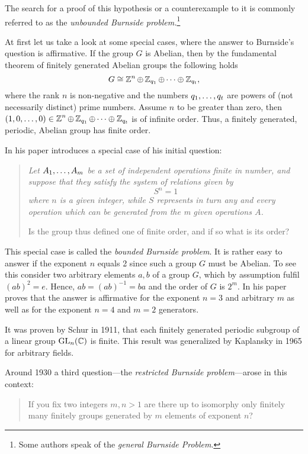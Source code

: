 The search for a proof of this hypothesis or a counterexample to it is commonly referred to as the \emph{unbounded Burnside problem.}\footnote{Some authors speak of the \emph{general Burnside Problem}.}

At first let us take a look at some special cases, where the answer to Burnside's question is affirmative. If the group $G$ is Abelian, then by the fundamental theorem of finitely generated Abelian groups the following holds
\begin{equation*}
G\cong\Z^n \oplus \Z_{q_1} \oplus \cdots \oplus \Z_{q_t},
\end{equation*}
where the rank $n$ is non-negative and the numbers $\seq[t]{q}$ are powers of (not necessarily distinct) prime numbers. Assume $n$ to be greater than zero, then $(1,0,\ldots,0)\in\Z^n \oplus \Z_{q_1} \oplus \cdots \oplus \Z_{q_t}$ is of infinite order. Thus, a finitely generated, periodic, Abelian group has finite order.

In his paper \textcite{burnside1902} introduces a special case of his initial question:
\begin{quotation}
\itshape%
Let $\seq[m]{A}$ be a set of independent operations finite in number, and suppose that they satisfy the system of relations given by
\begin{equation*}
S^n=1
\end{equation*}
where $n$ is a given integer, while $S$ represents in turn any and every operation which can be generated from the m given operations $A$.

Is the group thus defined one of finite order, and if so what is its order?
\end{quotation}
This special case is called the \emph{bounded Burnside problem}. It is rather easy to answer if the exponent $n$ equals 2 since such a group $G$ must be Abelian. To see this consider two arbitrary elements $a,b$ of a group $G$, which by assumption fulfil $(ab)^2=e$. Hence, $ab=(ab)^{-1}=ba$ and the order of $G$ is $2^m$. In his paper \textcite{burnside1902} proves that the answer is affirmative for the exponent $n=3$ and arbitrary $m$ as well as for the exponent $n=4$ and $m=2$ generators.

It was proven by Schur in 1911, that each finitely generated periodic subgroup of a linear group $\mathrm{GL}_n(\C)$ is finite. This result was generalized by Kaplansky in 1965 for arbitrary fields.

Around 1930 a third question---the \emph{restricted Burnside problem}---arose in this context:
\begin{quotation}
If you fix two integers $m,n>1$ are there up to isomorphy only finitely many finitely groups generated by $m$ elements of exponent $n$?
\end{quotation}

